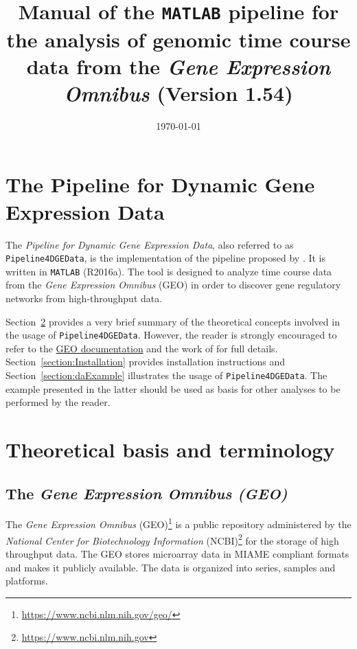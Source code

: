 \documentclass[final,letterpaper,12pt]{article}
\title{Manual of the \texttt{MATLAB} pipeline for the analysis of genomic time course data from the \textit{Gene Expression Omnibus} (Version 1.54)}
\date{\today}
\begin{document}
\maketitle

\tableofcontents

\listoffigures

\listoftables

\section{The Pipeline for Dynamic Gene Expression Data}
\label{section:pipeline}
\par The \textit{Pipeline for Dynamic Gene Expression Data}, also referred to as \texttt{Pipeline4DGEData}, is the implementation of the pipeline proposed by \cite{Carey2017}. It is written in \texttt{MATLAB} (R2016a). The tool is designed to analyze time course data from the \textit{Gene Expression Omnibus} (GEO) in order to discover gene regulatory networks from high-throughput data.

\par Section~\ref{section:theory_and_terminology} provides a very brief summary of the theoretical concepts involved in the usage of \texttt{Pipeline4DGEData}. However, the reader is strongly encouraged to refer to the \href{https://www.ncbi.nlm.nih.gov/geo/}{GEO documentation} and the work of \cite{Carey2017} for full details. Section~\ref{section:Installation} provides installation instructions and Section~\ref{section:daExample} illustrates the usage of \texttt{Pipeline4DGEData}.  The example presented in the latter should be used as basis for other analyses to be performed by the reader.

\section{Theoretical basis and terminology}
\label{section:theory_and_terminology}

\subsection{The \textit{Gene Expression Omnibus (GEO)}}

\par The \textit{Gene Expression Omnibus} (GEO)\footnote{\url{https://www.ncbi.nlm.nih.gov/geo/}} is a public repository administered by the \textit{National Center for Biotechnology Information} (NCBI)\footnote{\url{https://www.ncbi.nlm.nih.gov}} for the storage of high throughput data. The GEO stores microarray data in MIAME compliant formats and makes it publicly available. The data is organized into series, samples and platforms.
\end{document}
